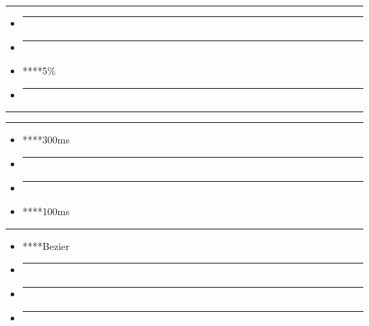 \begin{center}\rule{0.5\linewidth}{0.5pt}\end{center}

\begin{itemize}
\item
  \begin{center}\rule{0.5\linewidth}{0.5pt}\end{center}
\item
  \begin{center}\rule{0.5\linewidth}{0.5pt}\end{center}
\item
  ****5\%
\item
  \begin{center}\rule{0.5\linewidth}{0.5pt}\end{center}
\end{itemize}

\begin{center}\rule{0.5\linewidth}{0.5pt}\end{center}

\begin{center}\rule{0.5\linewidth}{0.5pt}\end{center}

\begin{itemize}
\item
  ****300ms
\item
  \begin{center}\rule{0.5\linewidth}{0.5pt}\end{center}
\item
  \begin{center}\rule{0.5\linewidth}{0.5pt}\end{center}
\item
  ****100ms
\end{itemize}

\begin{center}\rule{0.5\linewidth}{0.5pt}\end{center}

\begin{itemize}
\item
  ****Bezier
\item
  \begin{center}\rule{0.5\linewidth}{0.5pt}\end{center}
\item
  \begin{center}\rule{0.5\linewidth}{0.5pt}\end{center}
\item
  \begin{center}\rule{0.5\linewidth}{0.5pt}\end{center}
\end{itemize}


